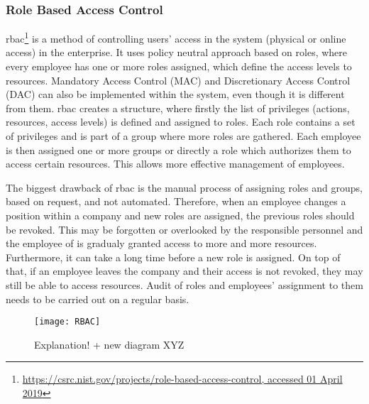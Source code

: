 \subsubsection{Role Based Access Control} \label{sec:sota-rbac}

\acrfull{rbac}\footnote{\url{https://csrc.nist.gov/projects/role-based-access-control, accessed 01 April 2019}} is a method of controlling users' access in the system (physical or online access) in the enterprise. It uses policy neutral approach based on roles, where every employee has one or more roles assigned, which define the access levels to resources. Mandatory Access Control (MAC) and Discretionary Access Control (DAC) can also be implemented within the system, even though it is different from them. \acrshort{rbac} creates a structure, where firstly the list of privileges (actions, resources, access levels) is defined and assigned to roles. Each role contains a set of privileges and is part of a group where more roles are gathered. Each employee is then assigned one or more groups or directly a role which authorizes them to access certain resources. This allows more effective management of employees.

The biggest drawback of \acrshort{rbac} is the manual process of assigning roles and groups, based on request, and not automated. Therefore, when an employee changes a position within a company and new roles are assigned, the previous roles should be revoked. This may be forgotten or overlooked by the responsible personnel and the employee of is gradualy granted access to more and more resources. Furthermore, it can take a long time before a new role is assigned. On top of that, if an employee leaves the company and their access is not revoked, they may still be able to access resources. Audit of roles and employees’ assignment to them needs to be carried out on a regular basis.

\begin{figure}[ht]
    \centering
    \texttt{[image: RBAC]}
    \caption{Explanation! + new diagram XYZ}
    \label{fig:RBAC_diagram_sota}
\end{figure}